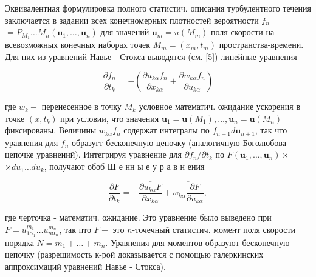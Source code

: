 \documentclass[10pt]{article}
\begin{document}
Эквивалентная формулировка полного статистич. описания турбулентного течения заключается в задании всех конечномерных плотностей вероятности $f_{n}=$ $=P_{M_{1}} \ldots M_{n}\left(\boldsymbol{u}_{1}, \ldots, \boldsymbol{u}_{n}\right)$ для значений $\boldsymbol{u}_{m}=u\left(M_{m}\right)$ поля скорости на всевозможных конечных наборах точек $M_{m}=\left(x_{m}, t_{m}\right)$ пространства-времени. Для них из уравнений Навье - Стокса выводятся (см. [5]) линейные уравнения



\[

\frac{\partial f_{n}}{\partial t_{k}}=-\left(\frac{\partial u_{k \alpha} f_{n}}{\partial x_{k \alpha}}+\frac{\partial w_{k \alpha} f_{n}}{\partial u_{k \alpha}}\right)

\]



где $w_{k}-$ перенесенное в точку $M_{k}$ условное математич. ожидание ускорения в точке $\left(x, t_{k}\right)$ при условии, что значения $\boldsymbol{u}_{1}=\boldsymbol{u}\left(M_{1}\right), \ldots, \boldsymbol{u}_{n}=\boldsymbol{u}\left(M_{n}\right)$ фиксированы. Величины $w_{k \alpha} f_{n}$ содержат интегралы по $f_{n+1} d \boldsymbol{u}_{n+1}$, так что уравнения для $f_{n}$ образугт бесконечную цепочку (аналогичную Боголюбова цепочке уравнений). Интегрируя уравнение для $\partial f_{n} / \partial t_{k}$ по $F\left(\boldsymbol{u}_{1}, \ldots, \boldsymbol{u}_{n}\right) \times$ $\times d u_{1} \ldots d u_{k}$, получают обоб Ш е нн ы е у р а в н ения



\[

\frac{\partial \bar{F}}{\partial t_{k}}=-\frac{\overline{\partial u_{k \alpha} F}}{\partial x_{k \alpha}}+\overline{w_{k \alpha} \frac{\partial F}{\partial u_{k \alpha}}},

\]



где черточка - математич. ожидание. Это уравнение было выведено при $F=u_{1 \alpha_{1}}^{m_{1}} \ldots u_{n \alpha_{n}}^{m_{n}}$, так пто $\bar{F}-$ это $n$-точечный статистич. момент поля скорости порядка $N=m_{1}+\ldots+m_{n}$. Уравнения для моментов образуют бесконечную цепочку (разрешимость к-рой доказывается с помощью галеркинских аппроксимаций уравнений Навье - Стокса).
\end{document}
